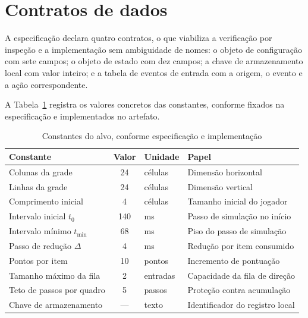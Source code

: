 \section{Contratos de dados}
\label{sec:esp-contratos}

A especificação declara quatro contratos, o que viabiliza a verificação por
inspeção e a implementação sem ambiguidade de nomes: o objeto de configuração
com sete campos; o objeto de estado com dez campos; a chave de armazenamento
local com valor inteiro; e a tabela de eventos de entrada com a origem, o evento
e a ação correspondente.

A Tabela~\ref{tab:constantes} registra os valores concretos das constantes,
conforme fixados na especificação e implementados no artefato.

\begin{table}[htb]
	\caption{Constantes do alvo, conforme especificação e implementação}
	\label{tab:constantes}
	\centering
	\footnotesize
	\begin{tabularx}{\textwidth}{@{}p{4.6cm} c p{1.6cm} X@{}}
		\toprule
		\textbf{Constante} & \textbf{Valor} & \textbf{Unidade} & \textbf{Papel} \\
		\midrule
		Colunas da grade & 24 & células & Dimensão horizontal \\
		\addlinespace
		Linhas da grade & 24 & células & Dimensão vertical \\
		\addlinespace
		Comprimento inicial & 4 & células & Tamanho inicial do jogador \\
		\addlinespace
		Intervalo inicial $t_0$ & 140 & ms & Passo de simulação no início \\
		\addlinespace
		Intervalo mínimo $t_{\min}$ & 68 & ms & Piso do passo de simulação \\
		\addlinespace
		Passo de redução $\Delta$ & 4 & ms & Redução por item consumido \\
		\addlinespace
		Pontos por item & 10 & pontos & Incremento de pontuação \\
		\addlinespace
		Tamanho máximo da fila & 2 & entradas & Capacidade da fila de direção \\
		\addlinespace
		Teto de passos por quadro & 5 & passos & Proteção contra acumulação \\
		\addlinespace
		Chave de armazenamento & --- & texto & Identificador do registro local \\
		\bottomrule
	\end{tabularx}
\end{table}

